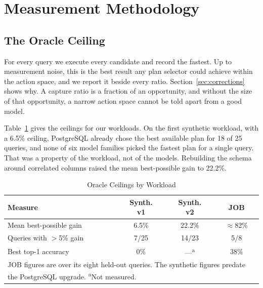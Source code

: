\documentclass[conference]{IEEEtran}
\begin{document}
\section{Measurement Methodology}
\label{sec:method}

\subsection{The Oracle Ceiling}
\label{sec:ceiling}

For every query we execute every candidate and record the fastest. Up to
measurement noise, this is the best result any plan selector could achieve
within the action space, and we report it beside every ratio. Section~\ref{sec:corrections} shows why. A capture
ratio is a fraction of an opportunity, and without the size of that
opportunity, a narrow action space cannot be told apart from a good model.

Table~\ref{tab:ceiling} gives the ceilings for our workloads. On the first
synthetic workload, with a 6.5\% ceiling, PostgreSQL already chose the best
available plan for 18 of 25 queries, and none of six model families picked the
fastest plan for a single query. That was a property of the workload, not of
the models. Rebuilding the schema around correlated columns raised the mean
best-possible gain to 22.2\%.

\begin{table}[t]
\caption{Oracle Ceilings by Workload}
\label{tab:ceiling}
\centering
\footnotesize
\setlength{\tabcolsep}{4pt}
\begin{tabular}{|l|c|c|c|}
\hline
\textbf{Measure} & \makecell{\textbf{Synth.}\\\textbf{v1}} &
  \makecell{\textbf{Synth.}\\\textbf{v2}} & \textbf{JOB} \\
\hline
Mean best-possible gain & 6.5\% & 22.2\% & $\approx$82\% \\
\hline
Queries with $>$5\% gain & 7/25 & 14/23 & 5/8 \\
\hline
Best top-1 accuracy & 0\% & ---\textsuperscript{a} & 38\% \\
\hline
\multicolumn{4}{p{0.85\columnwidth}}{\scriptsize JOB figures are over its eight
held-out queries. The synthetic figures predate the PostgreSQL upgrade.
\textsuperscript{a}Not measured.}
\end{tabular}
\end{table}
\end{document}
